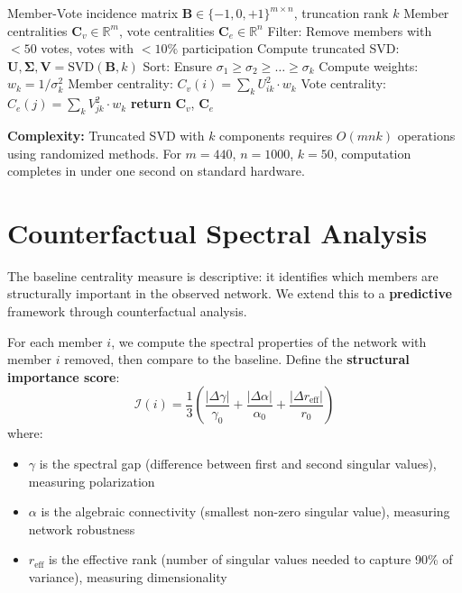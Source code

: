 \documentclass[11pt,a4paper]{article}
\begin{document}
\begin{algorithm}[H]
\caption{Compute Spectral Anatomy}
\begin{algorithmic}[1]
\Require Member-Vote incidence matrix $\mathbf{B} \in \{-1,0,+1\}^{m \times n}$, truncation rank $k$
\Ensure Member centralities $\mathbf{C}_v \in \mathbb{R}^m$, vote centralities $\mathbf{C}_e \in \mathbb{R}^n$
\State Filter: Remove members with $<50$ votes, votes with $<10\%$ participation
\State Compute truncated SVD: $\mathbf{U}, \mathbf{\Sigma}, \mathbf{V} = \text{SVD}(\mathbf{B}, k)$
\State Sort: Ensure $\sigma_1 \geq \sigma_2 \geq \dots \geq \sigma_k$
\State Compute weights: $w_k = 1/\sigma_k^2$
\State Member centrality: $C_v(i) = \sum_{k} U_{ik}^2 \cdot w_k$
\State Vote centrality: $C_e(j) = \sum_{k} V_{jk}^2 \cdot w_k$
\State \textbf{return} $\mathbf{C}_v$, $\mathbf{C}_e$
\end{algorithmic}
\end{algorithm}

\textbf{Complexity:} Truncated SVD with $k$ components requires $O(mnk)$ operations using randomized methods. For $m=440$, $n=1000$, $k=50$, computation completes in under one second on standard hardware.

\section{Counterfactual Spectral Analysis}

The baseline centrality measure is descriptive: it identifies which members are structurally important in the observed network. We extend this to a \textbf{predictive} framework through counterfactual analysis.

For each member $i$, we compute the spectral properties of the network with member $i$ removed, then compare to the baseline. Define the \textbf{structural importance score}:
\begin{equation}
\mathcal{I}(i) = \frac{1}{3} \left( \frac{|\Delta \gamma|}{\gamma_0} + \frac{|\Delta \alpha|}{\alpha_0} + \frac{|\Delta r_{\text{eff}}|}{r_0} \right)
\end{equation}
where:
\begin{itemize}
    \item $\gamma$ is the spectral gap (difference between first and second singular values), measuring polarization
    \item $\alpha$ is the algebraic connectivity (smallest non-zero singular value), measuring network robustness
    \item $r_{\text{eff}}$ is the effective rank (number of singular values needed to capture 90\% of variance), measuring dimensionality
\end{itemize}
\end{document}
